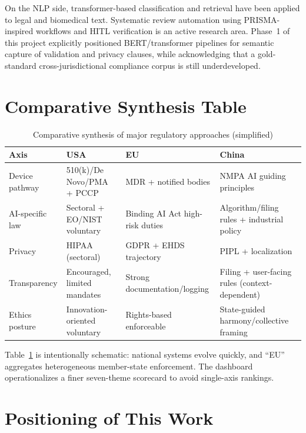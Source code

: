 On the NLP side, transformer-based classification and retrieval have been applied to legal and biomedical text. Systematic review automation using PRISMA-inspired workflows and HITL verification is an active research area. Phase~1 of this project explicitly positioned BERT/transformer pipelines for semantic capture of validation and privacy clauses, while acknowledging that a gold-standard cross-jurisdictional compliance corpus is still underdeveloped.

\section{Comparative Synthesis Table}
\label{sec:comptable}

\begin{table}[htbp]
\centering
\caption{Comparative synthesis of major regulatory approaches (simplified)}
\label{tab:synthesis}
\begin{tabular}{@{}p{2.2cm}p{3.0cm}p{3.0cm}p{3.2cm}@{}}
\toprule
\textbf{Axis} & \textbf{USA} & \textbf{EU} & \textbf{China} \\
\midrule
Device pathway & 510(k)/De Novo/PMA + PCCP & MDR + notified bodies & NMPA AI guiding principles \\
AI-specific law & Sectoral + EO/NIST voluntary & Binding AI Act high-risk duties & Algorithm/filing rules + industrial policy \\
Privacy & HIPAA (sectoral) & GDPR + EHDS trajectory & PIPL + localization \\
Transparency & Encouraged, limited mandates & Strong documentation/logging & Filing + user-facing rules (context-dependent) \\
Ethics posture & Innovation-oriented voluntary & Rights-based enforceable & State-guided harmony/collective framing \\
\bottomrule
\end{tabular}
\end{table}

Table~\ref{tab:synthesis} is intentionally schematic: national systems evolve quickly, and ``EU'' aggregates heterogeneous member-state enforcement. The dashboard operationalizes a finer seven-theme scorecard to avoid single-axis rankings.

\section{Positioning of This Work}
\label{sec:positioning}

